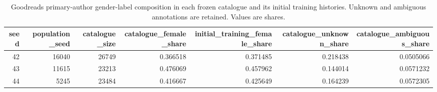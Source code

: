 \begin{table}[htbp!]
\centering
\small
\setlength{\tabcolsep}{3pt}
\renewcommand{\arraystretch}{1.1}
\begin{tabular}{rrrrrrr}
\hline
seed & population\_seed & catalogue\_size & catalogue\_female\_share & initial\_training\_female\_share & catalogue\_unknown\_share & catalogue\_ambiguous\_share \\
\hline
42 & 16040 & 26749 & 0.366518 & 0.371485 & 0.218438 & 0.0505066 \\
43 & 11615 & 23213 & 0.476069 & 0.457962 & 0.144014 & 0.0571232 \\
44 & 5245 & 23484 & 0.416667 & 0.425649 & 0.164239 & 0.0572305 \\
\hline
\end{tabular}
\caption{Goodreads primary-author gender-label composition in each frozen catalogue and its initial training histories. Unknown and ambiguous annotations are retained. Values are shares.}
\label{chap:results:tab:rq7_gender_reference_composition}
\end{table}
